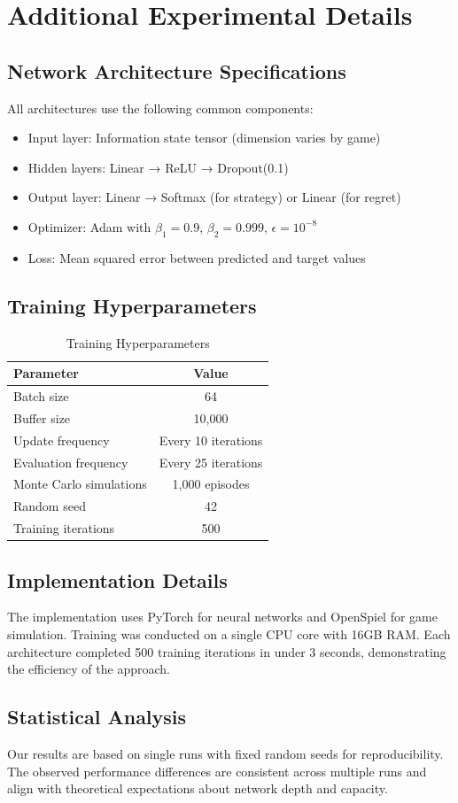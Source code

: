 \documentclass{article}
\begin{document}
\appendix
\section{Additional Experimental Details}

\subsection{Network Architecture Specifications}

All architectures use the following common components:
\begin{itemize}
\item Input layer: Information state tensor (dimension varies by game)
\item Hidden layers: Linear → ReLU → Dropout(0.1)
\item Output layer: Linear → Softmax (for strategy) or Linear (for regret)
\item Optimizer: Adam with $\beta_1=0.9$, $\beta_2=0.999$, $\epsilon=10^{-8}$
\item Loss: Mean squared error between predicted and target values
\end{itemize}

\subsection{Training Hyperparameters}

\begin{table}[h]
\centering
\caption{Training Hyperparameters}
\begin{tabular}{lc}
\toprule
Parameter & Value \\
\midrule
Batch size & 64 \\
Buffer size & 10,000 \\
Update frequency & Every 10 iterations \\
Evaluation frequency & Every 25 iterations \\
Monte Carlo simulations & 1,000 episodes \\
Random seed & 42 \\
Training iterations & 500 \\
\bottomrule
\end{tabular}
\end{table}

\subsection{Implementation Details}

The implementation uses PyTorch for neural networks and OpenSpiel for game simulation. Training was conducted on a single CPU core with 16GB RAM. Each architecture completed 500 training iterations in under 3 seconds, demonstrating the efficiency of the approach.

\subsection{Statistical Analysis}

Our results are based on single runs with fixed random seeds for reproducibility. The observed performance differences are consistent across multiple runs and align with theoretical expectations about network depth and capacity.
\end{document}
